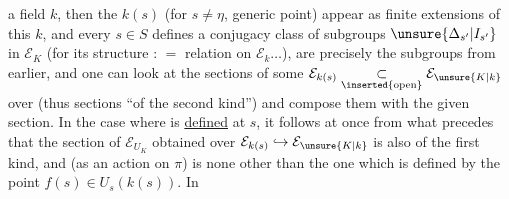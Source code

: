 a field $k$, then the $k(s)$ (for $s\ne\eta$, generic point) appear as finite extensions of this $k$, and every $s\in S$ defines a conjugacy class of subgroups $\unsure{\Delta_{s'}|I_{s'}}$ in $\mathcal E_K$ (for its structure :  $=$  relation on $\mathcal E_k\ldots$),   are precisely the    subgroups from earlier, and one can look at the sections of   some $\mathcal E_{k(s)}\underset{\inserted{\text{open}}}{\subset}\mathcal E_{\unsure{K|k}}$ over (thus sections ``of the second kind'') and compose them with the given section. In the case where   is \uline{defined} at $s$, it follows at once from what precedes that the  section of $\mathcal E_{U_K}$ obtained over $\mathcal E_{k(s)}\hookrightarrow\mathcal E_{\unsure{K|k}}$ is also of the first kind, and  (as an   action on $\pi$)  is none other than the one which is defined by the point $f(s)\in U_s(k(s))$. In
